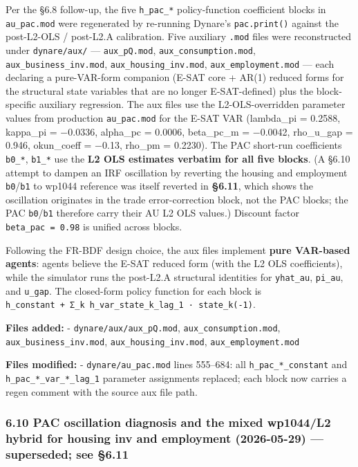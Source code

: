 \documentclass[
]{article}
\begin{document}
Per the §6.8 follow-up, the five \texttt{h\_pac\_*} policy-function
coefficient blocks in \texttt{au\_pac.mod} were regenerated by
re-running Dynare's \texttt{pac.print()} against the post-L2-OLS /
post-L2.A calibration. Five auxiliary \texttt{.mod} files were
reconstructed under \texttt{dynare/aux/} --- \texttt{aux\_pQ.mod},
\texttt{aux\_consumption.mod}, \texttt{aux\_business\_inv.mod},
\texttt{aux\_housing\_inv.mod}, \texttt{aux\_employment.mod} --- each
declaring a pure-VAR-form companion (E-SAT core + AR(1) reduced forms
for the structural state variables that are no longer E-SAT-defined)
plus the block-specific auxiliary regression. The aux files use the
L2-OLS-overridden parameter values from production \texttt{au\_pac.mod}
for the E-SAT VAR (lambda\_pi = 0.2588, kappa\_pi = −0.0336, alpha\_pc =
0.0006, beta\_pc\_m = −0.0042, rho\_u\_gap = 0.946, okun\_coeff = −0.13,
rho\_pm = 0.2230). The PAC short-run coefficients \texttt{b0\_*},
\texttt{b1\_*} use the \textbf{L2 OLS estimates verbatim for all five
blocks}. (A §6.10 attempt to dampen an IRF oscillation by reverting the
housing and employment \texttt{b0}/\texttt{b1} to wp1044 reference was
itself reverted in \textbf{§6.11}, which shows the oscillation
originates in the trade error-correction block, not the PAC blocks; the
PAC \texttt{b0}/\texttt{b1} therefore carry their AU L2 OLS values.)
Discount factor \texttt{beta\_pac\ =\ 0.98} is unified across blocks.

Following the FR-BDF design choice, the aux files implement \textbf{pure
VAR-based agents}: agents believe the E-SAT reduced form (with the L2
OLS coefficients), while the simulator runs the post-L2.A structural
identities for \texttt{yhat\_au}, \texttt{pi\_au}, and \texttt{u\_gap}.
The closed-form policy function for each block is
\texttt{h\_constant\ +\ Σ\_k\ h\_var\_state\_k\_lag\_1\ ·\ state\_k(-1)}.

\textbf{Files added:} - \texttt{dynare/aux/aux\_pQ.mod},
\texttt{aux\_consumption.mod}, \texttt{aux\_business\_inv.mod},
\texttt{aux\_housing\_inv.mod}, \texttt{aux\_employment.mod}

\textbf{Files modified:} - \texttt{dynare/au\_pac.mod} lines 555--684:
all \texttt{h\_pac\_*\_constant} and \texttt{h\_pac\_*\_var\_*\_lag\_1}
parameter assignments replaced; each block now carries a regen comment
with the source aux file path.

\subsubsection{\texorpdfstring{6.10 PAC oscillation diagnosis and the
mixed wp1044/L2 hybrid for housing inv and employment (2026-05-29) ---
\textbf{superseded; see
§6.11}}{6.10 PAC oscillation diagnosis and the mixed wp1044/L2 hybrid for housing inv and employment (2026-05-29) --- superseded; see §6.11}}\label{pac-oscillation-diagnosis-and-the-mixed-wp1044l2-hybrid-for-housing-inv-and-employment-2026-05-29-superseded-see-6.11}
\end{document}
